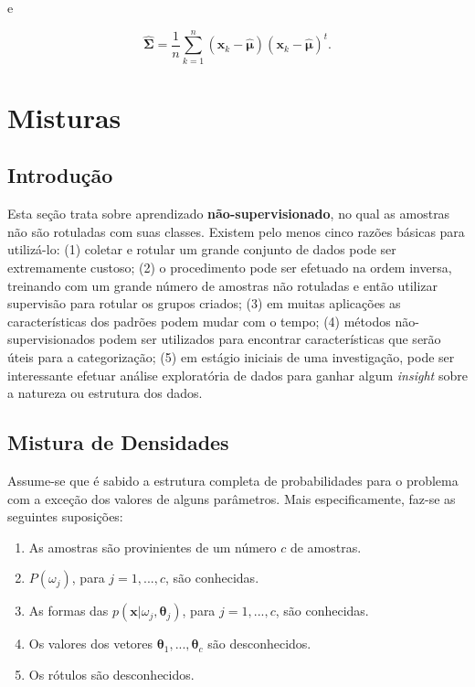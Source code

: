 \documentclass[a4paper,12pt,twocolumn]{article}
\begin{document}
\noindent e

\begin{equation}
    \boldsymbol{\hat{\Sigma}} = \frac{1}{n} \sum_{k=1}^n (\boldsymbol{x}_k - \boldsymbol{\hat{\mu}})(\boldsymbol{x}_k - \boldsymbol{\hat{\mu}})^t.
    \label{eq:bold_sigma_optimum_case_2}
\end{equation}

\section{Misturas}

\subsection{Introdução}

Esta seção trata sobre aprendizado \textbf{não-supervisionado}, no qual as amostras não são rotuladas com suas classes. Existem pelo menos cinco razões básicas para utilizá-lo: (1) coletar e rotular um grande conjunto de dados pode ser extremamente custoso; (2) o procedimento pode ser efetuado na ordem inversa, treinando com um grande número de amostras não rotuladas e então utilizar supervisão para rotular os grupos criados; (3) em muitas aplicações as características dos padrões podem mudar com o tempo; (4) métodos não-supervisionados podem ser utilizados para encontrar características que serão úteis para a categorização; (5) em estágio iniciais de uma investigação, pode ser interessante efetuar análise exploratória de dados para ganhar algum \emph{insight} sobre a natureza ou estrutura dos dados.

\subsection{Mistura de Densidades}

Assume-se que é sabido a estrutura completa de probabilidades para o problema com a exceção dos valores de alguns parâmetros. Mais especificamente, faz-se as seguintes suposições:

\begin{enumerate}\itemsep0pt
    \item As amostras são provinientes de um número $c$ de amostras.
    \item $P(\omega_j)$, para $j = 1, ..., c$, são conhecidas.
    \item As formas das $p(\boldsymbol{x}|\omega_j, \boldsymbol{\theta}_j)$, para $j = 1, ..., c$, são conhecidas.
    \item Os valores dos vetores $\boldsymbol{\theta}_1, ..., \boldsymbol{\theta}_c$ são desconhecidos.
    \item Os rótulos são desconhecidos.
\end{enumerate}
\end{document}
